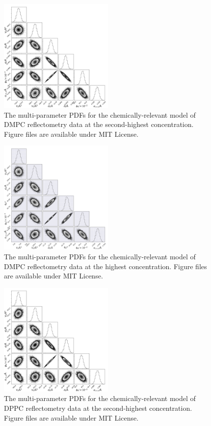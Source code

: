 \documentclass[11pt,a4paper]{article}
\begin{document}
\begin{figure}
	\centering
	\includegraphics[width=0.50\textwidth]{figures/dmpc4_all_corner}
	\caption{The multi-parameter PDFs for the chemically-relevant model of DMPC reflectometry data at the second-highest concentration. Figure files are available under MIT License.\cite{mccluskey_2018}}
	\label{fig:dmpc4}
\end{figure}
\begin{figure}
	\centering
	\includegraphics[width=0.50\textwidth]{figures/dmpc5_all_corner}
	\caption{The multi-parameter PDFs for the chemically-relevant model of DMPC reflectometry data at the highest concentration. Figure files are available under MIT License.\cite{mccluskey_2018}}
	\label{fig:dmpc5}
\end{figure}
\begin{figure}
	\centering
	\includegraphics[width=0.50\textwidth]{figures/dppc4_all_corner}
	\caption{The multi-parameter PDFs for the chemically-relevant model of DPPC reflectometry data at the second-highest concentration. Figure files are available under MIT License.\cite{mccluskey_2018}}
	\label{fig:dppc4}
\end{figure}
\end{document}
